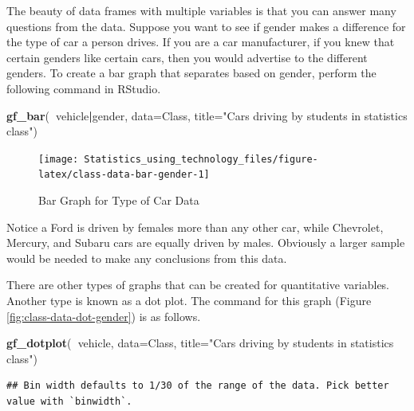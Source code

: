 \documentclass[
]{book}
\newenvironment{Shaded}{\begin{snugshade}}{\end{snugshade}}
\newcommand{\DataTypeTok}[1]{\textcolor[rgb]{0.13,0.29,0.53}{#1}}
\newcommand{\KeywordTok}[1]{\textcolor[rgb]{0.13,0.29,0.53}{\textbf{#1}}}
\newcommand{\NormalTok}[1]{#1}
\newcommand{\OperatorTok}[1]{\textcolor[rgb]{0.81,0.36,0.00}{\textbf{#1}}}
\newcommand{\StringTok}[1]{\textcolor[rgb]{0.31,0.60,0.02}{#1}}
\begin{document}
The beauty of data frames with multiple variables is that you can answer many questions from the data. Suppose you want to see if gender makes a difference for the type of car a person drives. If you are a car manufacturer, if you knew that certain genders like certain cars, then you would advertise to the different genders. To create a bar graph that separates based on gender, perform the following command in RStudio.



\begin{Shaded}
\begin{Highlighting}[]
\KeywordTok{gf_bar}\NormalTok{(}\OperatorTok{~}\NormalTok{vehicle}\OperatorTok{|}\NormalTok{gender, }\DataTypeTok{data=}\NormalTok{Class, }\DataTypeTok{title=}\StringTok{"Cars driving by students }
\StringTok{       in statistics class"}\NormalTok{)}
\end{Highlighting}
\end{Shaded}

\begin{figure}
\texttt{[image: Statistics\_using\_technology\_files/figure-latex/class-data-bar-gender-1]} \caption{Bar Graph for Type of Car Data}\label{fig:class-data-bar-gender}
\end{figure}

Notice a Ford is driven by females more than any other car, while Chevrolet, Mercury, and Subaru cars are equally driven by males. Obviously a larger sample would be needed to make any conclusions from this data.

There are other types of graphs that can be created for quantitative variables. Another type is known as a dot plot. The command for this graph (Figure \ref{fig:class-data-dot-gender}) is as follows.



\begin{Shaded}
\begin{Highlighting}[]
\KeywordTok{gf_dotplot}\NormalTok{(}\OperatorTok{~}\NormalTok{vehicle, }\DataTypeTok{data=}\NormalTok{Class, }\DataTypeTok{title=}\StringTok{"Cars driving by students }
\StringTok{           in statistics class"}\NormalTok{)}
\end{Highlighting}
\end{Shaded}

\begin{verbatim}
## Bin width defaults to 1/30 of the range of the data. Pick better value with `binwidth`.
\end{verbatim}
\end{document}
